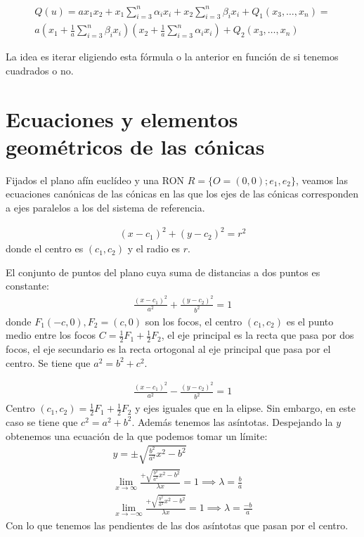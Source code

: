 \documentclass[14pt]{book}
\begin{document}
\begin{tm}
	\begin{multline}
		Q(u) = ax_1x_2 + x_1\sum_{i = 3}^{n}\alpha_ix_i + x_2\sum_{i = 3}^{n}\beta_ix_i + Q_1(x_3, \dots, x_n) = \\
		a(x_1 + \frac{1}{a}\sum_{i = 3}^{n} \beta_i x_i)(x_2 + \frac{1}{a}\sum_{i = 3}^{n}\alpha_i x_i) + Q_2(x_3, \dots, x_n)
	\end{multline}
\end{tm}

La idea es iterar eligiendo esta fórmula o la anterior en función de si tenemos cuadrados o no.


\section{Ecuaciones y elementos geométricos de las cónicas}
Fijados el plano afín euclídeo y una RON $R = \{O = (0,0); e_1, e_2\}$, veamos las ecuaciones canónicas de las cónicas en las que los ejes de las cónicas corresponden a ejes paralelos a los del sistema de referencia.

\begin{dfn}[Circunferencia]
	\begin{align*}
		(x - c_1)^2 + (y - c_2)^2 = r^2
	\end{align*}
	donde el centro es $(c_1, c_2)$ y el radio es $r$.
\end{dfn}

\begin{dfn}[Elipse]
	El conjunto de puntos del plano cuya suma de distancias a dos puntos es constante:
	\begin{align*}
		\frac{(x - c_1)^2}{a^2} + \frac{(y - c_2)^2}{b^2} = 1
	\end{align*}
	donde $F_1 (-c, 0), F_2 = (c, 0)$ son los focos, el centro $(c_1, c_2)$ es el punto medio entre los focos $C = \frac{1}{2}F_1 + \frac{1}{2}F_2$, el eje principal es la recta que pasa por dos focos, el eje secundario es la recta ortogonal al eje principal que pasa por el centro. Se tiene que $a^2 = b^2 + c^2$.
\end{dfn}

\begin{dfn}[Hipérbola]
	\begin{align*}
		\frac{(x - c_1)^2}{a^2} - \frac{(y - c_2)^2}{b^2} = 1
	\end{align*}
	Centro $(c_1, c_2) = \frac{1}{2}F_1 + \frac{1}{2}F_2$ y ejes iguales que en la elipse. Sin embargo, en este caso se tiene que $c^2 = a^2 + b^2$. Además tenemos las asíntotas. Despejando la $y$ obtenemos una ecuación de la que podemos tomar un límite:
	\begin{align*}
		y = \pm \sqrt{\frac{b^2}{a^2}x^2 - b^2} \\
		\lim\limits_{x \to \infty} \frac{+\sqrt{\frac{b^2}{a^2}x^2 - b^2}}{\lambda x} = 1 \implies \lambda = \frac{b}{a} \\
		\lim\limits_{x \to -\infty} \frac{+\sqrt{\frac{b^2}{a^2}x^2 - b^2}}{\lambda x} = 1 \implies \lambda = \frac{-b}{a}
	\end{align*}
	Con lo que tenemos las pendientes de las dos asíntotas que pasan por el centro.
\end{dfn}
\end{document}
